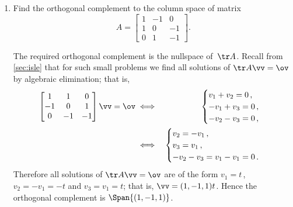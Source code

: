 \begin{example}
\begin{enumerate}
\item\label{eg:nulltrw:c} Find the orthogonal complement to the column space of matrix
\begin{equation*}
A=\begin{bmatrix} 1&-1&0\\ 1&0&-1\\ 0&1&-1 \end{bmatrix}.
\end{equation*}
\begin{solution} 
The required orthogonal complement is the nullspace of~\(\tr A\).
Recall from \autoref{sec:isle} that for such small problems we find all solutions of \(\tr A\vv=\ov\) by algebraic elimination; that is,
\begin{eqnarray*}
\begin{bmatrix} 1&1&0\\-1&0&1\\ 0&-1&-1 \end{bmatrix}\vv=\ov
&\iff&
\begin{cases}
v_1+v_2=0\,,\\
-v_1+v_3=0\,,\\
-v_2-v_3=0\,,
\end{cases}
\\&\iff&\begin{cases}
v_2=-v_1\,,\\
v_3=v_1\,,\\
-v_2-v_3=v_1-v_1=0\,.
\end{cases}
\end{eqnarray*}
Therefore all solutions of \(\tr A\vv=\ov\) are of the form \(v_1=t\)\,, \(v_2=-v_1=-t\) and \(v_3=v_1=t\); that is, \(\vv=(1,-1,1)t\).
Hence the orthogonal complement is \(\Span\{(1,-1,1)\}\).
\end{solution}


\end{enumerate}
\end{example}
